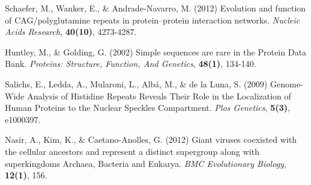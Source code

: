 \documentclass[a4,center,fleqn]{NAR}
\begin{document}
\begin{thebibliography}{4}
Schaefer, M., Wanker, E., \& Andrade-Navarro, M. (2012)
Evolution and function of CAG/polyglutamine repeats in protein–protein interaction networks.
\textit{Nucleic Acids Research}, \textbf{40(10)}, 4273-4287. 

Huntley, M., \& Golding, G. (2002)
Simple sequences are rare in the Protein Data Bank. 
\textit{Proteins: Structure, Function, And Genetics}, \textbf{48(1)}, 134-140. 

Salichs, E., Ledda, A., Mularoni, L., Alb\'a, M., \& de la Luna, S. (2009)
Genome-Wide Analysis of Histidine Repeats Reveals Their Role in the Localization of Human Proteins to the Nuclear Speckles Compartment. 
\textit{Plos Genetics}, \textbf{5(3)}, e1000397. 

Nasir, A., Kim, K., \& Caetano-Anolles, G. (2012)
Giant viruses coexisted with the cellular ancestors and represent a distinct supergroup along with superkingdoms Archaea, Bacteria and Eukarya. 
\textit{BMC Evolutionary Biology}, \textbf{12(1)}, 156. 

\end{thebibliography}

%
%
\end{document}
